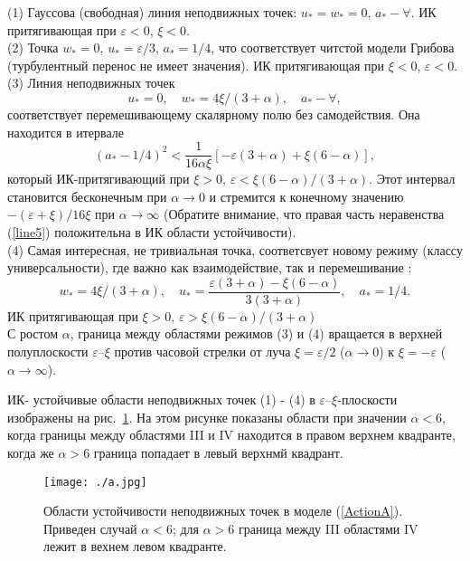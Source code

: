 \documentclass[a4paper,10pt]{article}
\begin{document}
(1)  Гауссова  (свободная) линия  неподвижных точек: $u_{*}=w_{*}=0$, $a_{*}- \forall $.
ИК притягивающая при  $\varepsilon<0$, $\xi<0$.\\

(2) Точка  $w_{*}=0$, $u_{*}=\varepsilon/3$, $a_{*}=1/4$, что соответствует читстой модели Грибова 
(турбулентный перенос не имеет значения).
ИК притягивающая при $\xi<0$, $\varepsilon<0$.\\

(3) Линия неподвижных точек
\begin{equation}
u_{*}=0, \quad w_{*}=4\xi/(3+\alpha), \quad  a_{*}- \forall,
\label{line4}
\end{equation}
соответствует перемешивающему скалярному полю без самодействия.
Она находится в итервале
\begin{equation}
(a_{*}-1/4)^{2} < \frac{1}{16\alpha\xi} \left[ -\varepsilon(3+\alpha) +
\xi(6-\alpha)  \right],
\label{line5}
\end{equation}
который ИК-притягивающий при $\xi>0$, $\varepsilon< \xi (6-\alpha)/(3+\alpha)$.
Этот интервал становится бесконечным при $\alpha\to0$ и стремится к конечному
 значению $-(\varepsilon+\xi)/16\xi$ при $\alpha\to\infty$  (Обратите внимание, что правая 
часть неравенства (\ref{line5}) положительна в ИК области устойчивости).\\

(4) Самая интересная, не тривиальная точка, соответсвует новому режиму (классу универсальности), где важно как взаимодействие, так и перемешивание :
\begin{equation}
w_{*}= 4\xi/(3+\alpha), \quad u_{*} = \frac{ \varepsilon (3+\alpha) -
\xi(6-\alpha)} {3(3+\alpha)}, \quad a_{*}=1/4.
\label{wu44}
\end{equation}
ИК притягивающая при $\xi>0$, $\varepsilon> \xi (6-\alpha)/(3+\alpha)$ \\


С ростом $\alpha$, граница между областями режимов (3) и (4) вращается в 
верхней полуплоскости $\varepsilon$--$\xi$ против часовой стрелки от луча  $\xi=\varepsilon/2$ ($\alpha\to0$) к  $\xi=-\varepsilon$ ($\alpha\to\infty$).

ИК- устойчивые области неподвижных точек (1) - (4) в $\varepsilon$--$\xi$-плоскости изображены на рис.~\ref{fig:pattA}.
На этом рисунке показаны области при значении $\alpha<6$,
 когда границы между областями III и IV находится в правом верхнем квадранте, когда же $\alpha>6$ граница попадает в левый верхнмй квадрант.

\begin{figure}[H]
\begin{center}
\texttt{[image: ./a.jpg]}
\caption{\label{fig:pattA} Области устойчивости неподвижных точек в моделе 
(\protect\ref{ActionA}). Приведен случай $\alpha<6$;
для $\alpha>6$ граница между III областями IV лежит в вехнем левом квадранте.}
\end{center}
\end{figure}
\end{document}
